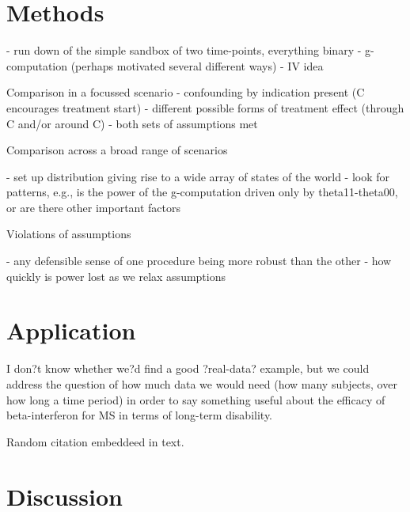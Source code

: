 \documentclass[11pt]{amsart}
\begin{document}


 \section{Methods}
 
- run down of the simple sandbox of two time-points, everything binary 
	- g-computation (perhaps motivated several different ways)
	- IV idea

Comparison in a focussed scenario
-	confounding by indication present (C encourages treatment start)
-	different possible forms of treatment effect (through C and/or around C)
-	both sets of assumptions met

Comparison across a broad range of scenarios

-	set up distribution giving rise to a wide array of states of the world
-	look for patterns, e.g., is the power of the g-computation driven only by theta11-theta00, or are there other important factors
    
Violations of assumptions

-	any defensible sense of one procedure being more robust than the other
-	how quickly is power lost as we relax assumptions


 \section{Application}

I don?t know whether we?d find a good ?real-data? example, but we could address the question of how much data we would need (how many subjects, over how long a time period) in order to say something useful about the efficacy of beta-interferon for MS in terms of long-term disability.

Random citation \cite{saarela2015bayesian} embeddeed in text.



 \section{Discussion}
\newpage

 

\end{document}
